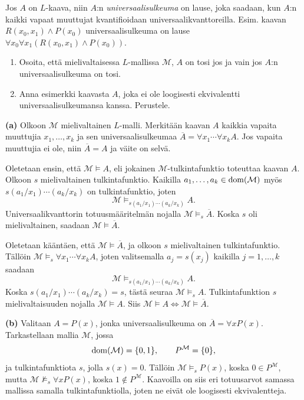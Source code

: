 \documentclass[11pt,a4paper]{amsart}
\begin{document}
\begin{exercise}
  Jos \(A\) on \(L\)-kaava, niin \(A\):n \emph{universaalisulkeuma} on
  lause, joka saadaan, kun \(A\):n kaikki vapaat muuttujat kvantifioidaan
  universaalikvanttoreilla. Esim. kaavan \(R(x_0,x_1) \land P(x_0)\)
  universaalisulkeuma on lause
  \(\forall x_0\forall x_1(R(x_0,x_1) \land P(x_0))\).
  \begin{enumerate}[label=(\alph*)]
    \item Osoita, että mielivaltaisessa \(L\)-mallissa \(\mathcal M\),
      \(A\) on tosi jos ja vain jos \(A\):n universaalisulkeuma on tosi.
    \item Anna esimerkki kaavasta \(A\), joka ei ole loogisesti ekvivalentti
      universaalisulkeumansa kanssa. Perustele.
  \end{enumerate}
\end{exercise}

\begin{solution}
  \textbf{(a)} Olkoon \(\mathcal M\) mielivaltainen \(L\)-malli.
  Merkitään kaavan \(A\) kaikkia vapaita muuttujia
  \(x_1,\ldots,x_k\) ja sen universaalisulkeumaa
  \(\overline A = \forall x_1\cdots\forall x_k A\).
  Jos vapaita muuttujia ei ole, niin \(\overline A = A\) ja väite on selvä.

  Oletetaan ensin, että \(\mathcal M \models A\), eli jokainen
  \(\mathcal M\)-tulkintafunktio toteuttaa kaavan \(A\).
  Olkoon \(s\) mielivaltainen tulkintafunktio. Kaikilla
  \(a_1,\ldots,a_k \in \operatorname{dom}(\mathcal M)\) myös
  \(s(a_1/x_1)\cdots(a_k/x_k)\) on tulkintafunktio, joten
  \[
    \mathcal M \models_{s(a_1/x_1)\cdots(a_k/x_k)} A.
  \]
  Universaalikvanttorin totuusmääritelmän nojalla
  \(\mathcal M \models_s \overline A\). Koska \(s\) oli mielivaltainen,
  saadaan \(\mathcal M \models \overline A\).

  Oletetaan kääntäen, että \(\mathcal M \models \overline A\), ja olkoon
  \(s\) mielivaltainen tulkintafunktio. Tällöin
  \(\mathcal M \models_s \forall x_1\cdots\forall x_k A\), joten
  valitsemalla \(a_j = s(x_j)\) kaikilla \(j=1,\ldots,k\) saadaan
  \[
    \mathcal M \models_{s(a_1/x_1)\cdots(a_k/x_k)} A.
  \]
  Koska \(s(a_1/x_1)\cdots(a_k/x_k) = s\), tästä seuraa
  \(\mathcal M \models_s A\). Tulkintafunktion \(s\) mielivaltaisuuden
  nojalla \(\mathcal M \models A\). Siis
  \(\mathcal M \models A \iff \mathcal M \models \overline A\).

  \medskip
  \textbf{(b)} Valitaan \(A = P(x)\), jonka universaalisulkeuma on
  \(\overline A = \forall xP(x)\). Tarkastellaan mallia \(\mathcal M\), jossa
  \[
    \operatorname{dom}(\mathcal M) = \{0,1\},
    \qquad P^{\mathcal M} = \{0\},
  \]
  ja tulkintafunktiota \(s\), jolla \(s(x)=0\). Tällöin
  \(\mathcal M \models_s P(x)\), koska \(0 \in P^{\mathcal M}\), mutta
  \(\mathcal M \not\models_s \forall xP(x)\), koska
  \(1 \notin P^{\mathcal M}\). Kaavoilla on siis eri totuusarvot samassa
  mallissa samalla tulkintafunktiolla, joten ne eivät ole loogisesti
  ekvivalentteja.\qedhere
\end{solution}
\end{document}
